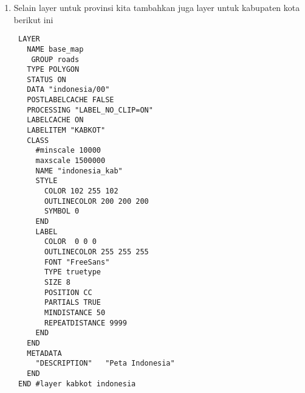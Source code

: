 \begin{enumerate}
\begin{lstlisting}
       OUTLINECOLOR 255 255 255
       FONT "FreeSans"
       TYPE truetype
       SIZE 6
       POSITION lc
       PARTIALS true
       MINDISTANCE 200
     END
   END
   CLASS
     EXPRESSION "SULAWESI TENGGARA"
     STYLE
       COLOR 229 255 204
     END
     LABEL
       COLOR  0 0 0
       OUTLINECOLOR 255 255 255
       FONT "FreeSans"
       TYPE truetype
       SIZE 6
       POSITION lc
       PARTIALS true
       MINDISTANCE 200
     END
   END
   CLASS
     EXPRESSION "GORONTALO"
     STYLE
       COLOR 204 255 229
     END
     LABEL
       COLOR  0 0 0
       OUTLINECOLOR 255 255 255
       FONT "FreeSans"
       TYPE truetype
       SIZE 6
       POSITION lc
       PARTIALS true
       MINDISTANCE 200
     END
   END
   CLASS
     EXPRESSION "SULAWESI BARAT"
     STYLE
       COLOR 153 255 204
     END
     LABEL
       COLOR  0 0 0
       OUTLINECOLOR 255 255 255
       FONT "FreeSans"
       TYPE truetype
       SIZE 6
       POSITION lc
       PARTIALS true
       MINDISTANCE 200
     END
   END
   CLASS
     EXPRESSION "MALUKU"
     STYLE
       COLOR 153 255 153
     END
     LABEL
       COLOR  0 0 0
       OUTLINECOLOR 255 255 255
       FONT "FreeSans"
       TYPE truetype
       SIZE 6
       POSITION lc
       PARTIALS true
       MINDISTANCE 200
     END
   END
   CLASS
     EXPRESSION "MALUKU UTARA"
     STYLE
       COLOR 204 255 204
     END
     LABEL
       COLOR  0 0 0
       OUTLINECOLOR 255 255 255
       FONT "FreeSans"
       TYPE truetype
       SIZE 6
       POSITION lc
       PARTIALS true
       MINDISTANCE 200
     END
   END
   CLASS
     EXPRESSION "PAPUA BARAT"
     STYLE
       COLOR 229 255 204
     END
     LABEL
       COLOR  0 0 0
       OUTLINECOLOR 255 255 255
       FONT "FreeSans"
       TYPE truetype
       SIZE 6
       POSITION lc
       PARTIALS true
       MINDISTANCE 200
     END
   END
   CLASS
     EXPRESSION "PAPUA"
     STYLE
       COLOR 204 255 229
     END
     LABEL
       COLOR  0 0 0
       OUTLINECOLOR 255 255 255
       FONT "FreeSans"
       TYPE truetype
       SIZE 6
       POSITION lc
       PARTIALS true
       MINDISTANCE 200
     END
   END
 END #layer provinsi
\end{lstlisting}

\item Selain layer untuk provinsi kita tambahkan juga layer untuk kabupaten kota berikut ini
\begin{lstlisting}
 LAYER
   NAME base_map
    GROUP roads
   TYPE POLYGON
   STATUS ON
   DATA "indonesia/00"
   POSTLABELCACHE FALSE
   PROCESSING "LABEL_NO_CLIP=ON"
   LABELCACHE ON
   LABELITEM "KABKOT"
   CLASS
     #minscale 10000
     maxscale 1500000
     NAME "indonesia_kab"
     STYLE
       COLOR 102 255 102
       OUTLINECOLOR 200 200 200
       SYMBOL 0
     END
     LABEL
       COLOR  0 0 0
       OUTLINECOLOR 255 255 255
       FONT "FreeSans"
       TYPE truetype
       SIZE 8
       POSITION CC
       PARTIALS TRUE
       MINDISTANCE 50
       REPEATDISTANCE 9999
     END
   END
   METADATA
     "DESCRIPTION"   "Peta Indonesia"
   END
 END #layer kabkot indonesia
\end{lstlisting}
\end{enumerate}